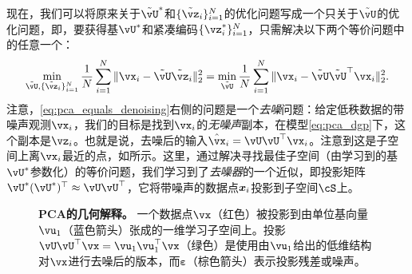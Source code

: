 \documentclass[../../book-main_zh.tex]{subfiles}
\begin{document}
现在，我们可以将原来关于\(\tilde{\vU}^{\ast}\)和\(\{\tilde{\vz}_{i}\}_{i = 1}^{N}\)的优化问题写成一个只关于\(\tilde{\vU}\)的优化问题，即，要获得基\(\vU^{\ast}\)和紧凑编码\(\{\vz_{i}^{\ast}\}_{i = 1}^{N}\)，只需解决以下两个等价问题中的任意一个：
\begin{equation}\label{eq:pca_equals_denoising}
    \min_{\tilde{\vU}, \{\tilde{\vz}_{i}\}_{i = 1}^{N}}\frac{1}{N}\sum_{i = 1}^{N}\norm{\vx_{i} - \tilde{\vU}\tilde{\vz}_{i}}_{2}^{2} = \min_{\tilde{\vU}}\frac{1}{N}\sum_{i = 1}^{N}\norm{\vx_{i} - \tilde{\vU}\tilde{\vU}^{\top}\vx_{i}}_{2}^{2}.
\end{equation}
注意，\eqref{eq:pca_equals_denoising}右侧的问题是一个\textit{去噪}问题：给定低秩数据的带噪声观测\(\vx_{i}\)，我们的目标是找到\(\vx_{i}\)的\textit{无噪声}副本，在模型\eqref{eq:pca_dgp}下，这个副本是$\vz_{i}$。也就是说，去噪后的输入$\hat{\vx}_i = \vU\vU^\top \vx_i$。注意到这是子空间上离$\vx_i$最近的点，如所示。这里，通过解决寻找最佳子空间（由学习到的基\(\vU^{\ast}\)参数化）的等价问题，我们学习到了\textit{去噪器}的一个近似，即投影矩阵\(\vU^{\ast}(\vU^{\ast})^{\top} \approx \vU\vU^{\top}\)，它将带噪声的数据点$\bm{x}_i$投影到子空间\(\cS\)上。%

\begin{figure}
    \centering
    \caption{\small \textbf{PCA的几何解释。} 一个数据点$\vx$（红色）被投影到由单位基向量$\vu_1$（蓝色箭头）张成的一维学习子空间上。投影$\vU\vU^\top\vx = \vu_{1}\vu_{1}^{\top}\vx$（绿色）是使用由$\vu_{1}$给出的低维结构对$\vx$进行去噪后的版本，而$\boldsymbol{\varepsilon}$（棕色箭头）表示投影残差或噪声。}
    \label{fig:pca-geometry}
\end{figure}
\end{document}
